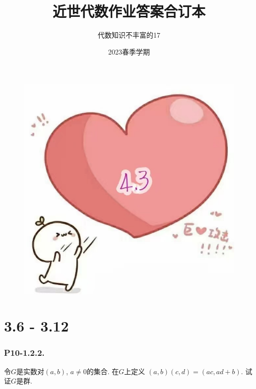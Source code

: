 \documentclass[12pt, a4paper, fontset=windows]{ctexart}
\title{\Huge\bf 近世代数作业答案合订本}
\author{代数知识不丰富的17}
\date{2023春季学期}
\begin{document}
\setcounter{page}{-1}

\maketitle

\begin{figure}[!htbp]
    \centering
    \includegraphics[width=\textwidth]{figs/4.3.jpg}
\end{figure}

\thispagestyle{empty}

\clearpage

\begin{center}
    \tableofcontents
\end{center}

\thispagestyle{empty}

\clearpage
\part{3.6 - 3.12}

\section*{P10-1.2.2.}

令$G$是实数对$(a,b)$, $a\ne 0$的集合. 在$G$上定义
$(a,b)(c,d)=(ac,ad+b)$. 试证$G$是群. 
\end{document}
